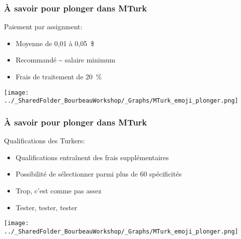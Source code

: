 \documentclass{beamer}
\begin{document}
    \begin{frame}
    
      \frametitle{À savoir pour plonger dans MTurk} \vspace{1cm}
      
      Paiement par assignment:
       \begin{itemize}
          \item{Moyenne de 0,01 à 0,05~\$}
          \item{Recommandé \~{} salaire minimum}
          \item{Frais de traitement de 20~\%}
        \end{itemize}
  
   \begin{flushright}
     	    \texttt{[image: ../\_SharedFolder\_BourbeauWorkshop/\_Graphs/MTurk\_emoji\_plonger.png]}
    \end{flushright} 
         
    \end{frame}  
    
    

    \begin{frame}
    
      \frametitle{À savoir pour plonger dans MTurk} \vspace{1cm}
      
      Qualifications des Turkers:
       \begin{itemize}
          \item{Qualifications entraînent des frais supplémentaires}
          \item{Possibilité de sélectionner parmi plus de 60 spécificités}
          \item{Trop, c'est comme pas assez}
          \item{Tester, tester, tester}
        \end{itemize}
   
   \begin{flushright}
     	    \texttt{[image: ../\_SharedFolder\_BourbeauWorkshop/\_Graphs/MTurk\_emoji\_plonger.png]}
    \end{flushright} 
         
    \end{frame}  
    
\end{document}
